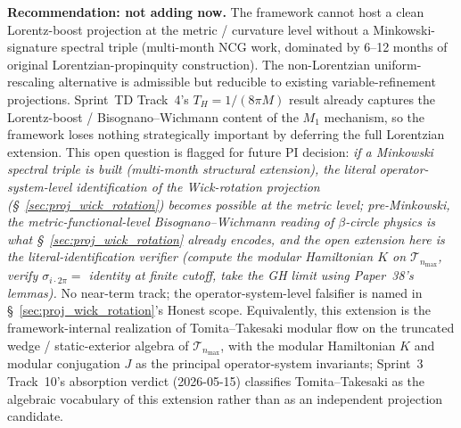 \documentclass[11pt]{article}
\begin{document}
\begin{enumerate}
\textbf{Recommendation: not adding now.}  The framework cannot host
a clean Lorentz-boost projection at the metric / curvature level
without a Minkowski-signature spectral triple (multi-month NCG
work, dominated by 6--12 months of original Lorentzian-propinquity
construction).  The non-Lorentzian uniform-rescaling alternative is
admissible but reducible to existing variable-refinement
projections.  Sprint~TD Track~4's $T_H = 1/(8\pi M)$ result already
captures the Lorentz-boost / Bisognano--Wichmann content of the
$M_1$ mechanism, so the framework loses nothing strategically
important by deferring the full Lorentzian extension.  This open
question is flagged for future PI decision: \emph{if a Minkowski
spectral triple is built (multi-month structural extension), the
literal operator-system-level identification of the Wick-rotation
projection (\S~\ref{sec:proj_wick_rotation}) becomes possible at the
metric level; pre-Minkowski, the metric-functional-level
Bisognano--Wichmann reading of $\beta$-circle physics is what
\S~\ref{sec:proj_wick_rotation} already encodes, and the open
extension here is the literal-identification verifier (compute the
modular Hamiltonian $K$ on $\mathcal{T}_{n_\text{max}}$, verify
$\sigma_{i\cdot 2\pi} = $ identity at finite cutoff, take the
GH limit using Paper~38's lemmas).}  No near-term track; the
operator-system-level falsifier is named in
\S~\ref{sec:proj_wick_rotation}'s Honest scope.  Equivalently, this
extension is the framework-internal realization of Tomita--Takesaki
modular flow on the truncated wedge / static-exterior algebra of
$\mathcal{T}_{n_{\max}}$, with the modular Hamiltonian $K$ and modular
conjugation $J$ as the principal operator-system invariants;
Sprint~3 Track~10's absorption verdict
(2026-05-15) classifies Tomita--Takesaki as the algebraic vocabulary
of this extension rather than as an independent projection candidate.


\end{enumerate}
\end{document}
